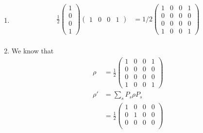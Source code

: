 \documentclass{article}%
\begin{document}
\begin{enumerate}
    \item \begin{align*}
              \frac{1}{2} \begin{pmatrix}
                              1 \\
                              0 \\
                              0 \\
                              1
                          \end{pmatrix}\begin{pmatrix}
                                           1 & 0 & 0 & 1
                                       \end{pmatrix} & =1/2 \begin{pmatrix}
                                                                1 & 0 & 0 & 1 \\
                                                                0 & 0 & 0 & 0 \\
                                                                0 & 0 & 0 & 0 \\
                                                                1 & 0 & 0 & 1
                                                            \end{pmatrix} \\
          \end{align*}
    \item We know that
          \begin{align*}
              \rho  & = \frac{1}{2} \begin{pmatrix}
                                        1 & 0 & 0 & 1 \\
                                        0 & 0 & 0 & 0 \\
                                        0 & 0 & 0 & 0 \\
                                        1 & 0 & 0 & 1
                                    \end{pmatrix} \\
              \rho' & = \sum_{s}^{} P_s \rho P_s   \\
                    & = \frac{1}{2} \begin{pmatrix}
                                        1 & 0 & 0 & 0 \\
                                        0 & 1 & 0 & 0 \\
                                        0 & 0 & 0 & 0 \\

\end{pmatrix}
\end{align*}
\end{enumerate}
\end{document}
